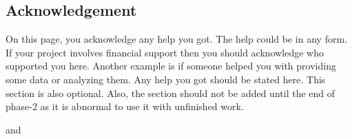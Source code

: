 \begin{center}
  \section*{Acknowledgement}
\end{center}


\begin{spacing}{1.5}
On this page, you acknowledge any help you got. The help could be in any form. If your project involves financial support then you should acknowledge who supported you here. Another example is if someone helped you with providing some data or analyzing them. Any help you got should be stated here. This section is also optional. Also, the section should not be added until the end of phase-2 as it is abnormal to use it with unfinished work.
\end{spacing}

\begin{flushright}
  {\firststudentname} and {\secondstudentname}
\end{flushright}

\clearpage
\vspace*{2cm}